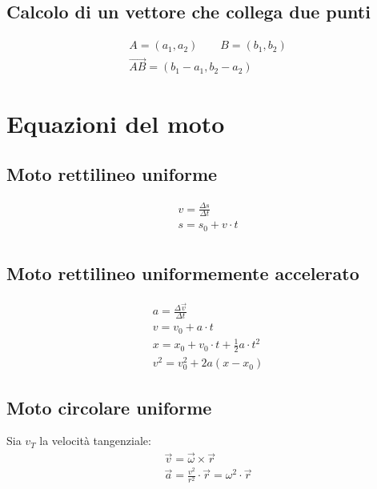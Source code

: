 \subsection{Calcolo di un vettore che collega due punti}
	\begin{displaymath}\begin{aligned}
    	A = (a_1, a_2) \qquad B = (b_1, b_2)\\
        \vec{AB} = (b_1 - a_1, b_2 - a_2)
    \end{aligned}\end{displaymath}

\section{Equazioni del moto}
\subsection{Moto rettilineo uniforme}
	\begin{displaymath}\begin{aligned}
		v = \frac{\Delta s}{\Delta t}\\
        s = s_0 + v \cdot t\\
	\end{aligned}\end{displaymath}
\subsection{Moto rettilineo uniformemente accelerato}
	\begin{displaymath}\begin{aligned}
        a = \frac{\Delta \vec{v}}{\Delta t}\\
        v = v_0 + a \cdot t\\
        x = x_0 + v_0 \cdot t + \frac{1}{2} a\cdot t^2\\
        v^2 = v_0^2 +2a(x-x_0)
	\end{aligned}\end{displaymath}
\subsection{Moto circolare uniforme}
Sia $v_T$ la velocità tangenziale:
	\begin{displaymath}\begin{aligned}
        \vec{v} = \vec{\omega} \times \vec{r}\\
        \vec{a} = \frac{v^2}{r^2} \cdot \vec{r} = \omega^2 \cdot \vec{r} 
	\end{aligned}\end{displaymath}	
